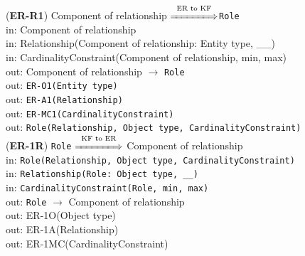 \documentclass[sn-mathphys]{sn-jnl}
\begin{document}
{{({\bf ER-R1}) Component of relationship $\overset{\text{ER to KF}}{\xLongrightarrow{\hspace*{1.4cm}}}${\tt Role}\\
\hspace*{0.3cm}in: Component of relationship\\
\hspace*{0.3cm}in: Relationship(Component of relationship: Entity type, \_\_)\\
\hspace*{0.3cm}in: CardinalityConstraint(Component of relationship, min, max)\\
\hspace*{0.5cm}out: Component of relationship $\rightarrow$ {\tt Role}\\
\hspace*{0.5cm}out: {\tt ER-O1(Entity type)}\\
\hspace*{0.5cm}out: {\tt ER-A1(Relationship)}\\
\hspace*{0.5cm}out: {\tt  ER-MC1(CardinalityConstraint)}\\
\hspace*{0.5cm}out: {\tt Role(Relationship, Object type, CardinalityConstraint)}\\

({\bf ER-1R}) {\tt Role} $\overset{\text{KF to ER}}{\xLongrightarrow{\hspace*{1.4cm}}}${ Component of relationship\\
\hspace*{0.3cm}in: {\tt Role(Relationship, Object type, CardinalityConstraint)}\\
\hspace*{0.3cm}in: {\tt Relationship(Role: Object type, \_\_)}\\
\hspace*{0.3cm}in: {\tt CardinalityConstraint(Role, min, max)}\\
\hspace*{0.5cm}out: {\tt Role} $\rightarrow$ {Component of relationship}\\
\hspace*{0.5cm}out: {ER-1O(Object type)}\\
\hspace*{0.5cm}out: {ER-1A(Relationship)}\\
\hspace*{0.5cm}out: {ER-1MC(CardinalityConstraint)}\\

}}}
\end{document}
